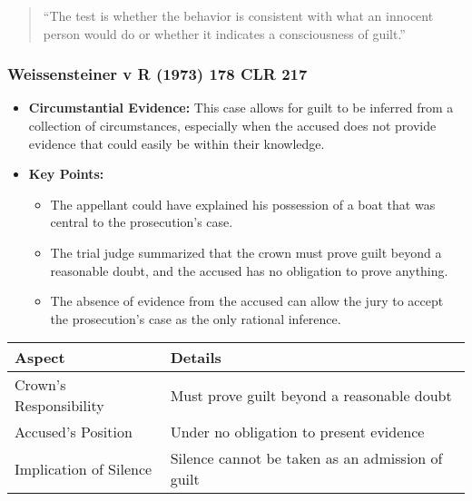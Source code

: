 \begin{quote}
``The test is whether the behavior is consistent with what an innocent
person would do or whether it indicates a consciousness of guilt.''
\end{quote}

\subsubsection{Weissensteiner v R (1973) 178 CLR
217}\label{weissensteiner-v-r-1973-178-clr-217}

\begin{itemize}
\tightlist
\item
  \textbf{Circumstantial Evidence:} This case allows for guilt to be
  inferred from a collection of circumstances, especially when the
  accused does not provide evidence that could easily be within their
  knowledge.
\item
  \textbf{Key Points:}

  \begin{itemize}
  \tightlist
  \item
    The appellant could have explained his possession of a boat that was
    central to the prosecution's case.
  \item
    The trial judge summarized that the crown must prove guilt beyond a
    reasonable doubt, and the accused has no obligation to prove
    anything.
  \item
    The absence of evidence from the accused can allow the jury to
    accept the prosecution's case as the only rational inference.
  \end{itemize}
\end{itemize}

\begin{longtable}[]{@{}
  >{\raggedright\arraybackslash}p{}
  >{\raggedright\arraybackslash}p{}@{}}
\toprule\noalign{}
\begin{minipage}[b]{\linewidth}\raggedright
Aspect
\end{minipage} & \begin{minipage}[b]{\linewidth}\raggedright
Details
\end{minipage} \\
\midrule\noalign{}
\endhead
\bottomrule\noalign{}
\endlastfoot
Crown's Responsibility & Must prove guilt beyond a reasonable doubt \\
Accused's Position & Under no obligation to present evidence \\
Implication of Silence & Silence cannot be taken as an admission of
guilt \\
\end{longtable}

